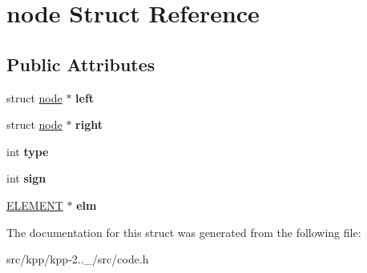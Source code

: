 \hypertarget{structnode}{}\section{node Struct Reference}
\label{structnode}
\subsection*{Public Attributes}
\begin{DoxyCompactItemize}
\item 
\mbox{\label{structnode_af7109e6ffd82cbbb705e486fd0ce92f0}} 
struct \mbox{\hyperlink{structnode}{node}} $\ast$ {\bfseries left}
\item 
\mbox{\label{structnode_a51e160f22dc6064bac4a4f9f1d931c2c}} 
struct \mbox{\hyperlink{structnode}{node}} $\ast$ {\bfseries right}
\item 
\mbox{\label{structnode_a22a8c9208225c949d26f371f8b82bc36}} 
int {\bfseries type}
\item 
\mbox{\label{structnode_a85b0cc12aae8e06f6fafce4dd2f47b97}} 
int {\bfseries sign}
\item 
\mbox{\label{structnode_adc305f25387cd5b2dba77adfcc86b469}} 
\mbox{\hyperlink{structELEMENT}{E\+L\+E\+M\+E\+NT}} $\ast$ {\bfseries elm}
\end{DoxyCompactItemize}


The documentation for this struct was generated from the following file\+:\begin{DoxyCompactItemize}
\item 
src/kpp/kpp-\/2..\+\_/src/code.\+h\end{DoxyCompactItemize}
